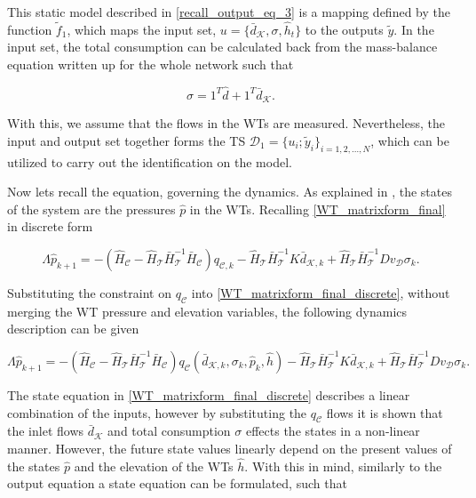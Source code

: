 This static model described in \eqref{recall_output_eq_3} is a mapping defined by the function $\tilde{f}_1$, which maps the input set, $u = \{ \bar{d}_{\mathcal{K}}, \sigma, \hat{h}_t \}$ to the outputs $\tilde{y}$. In the input set, the total consumption can be calculated back from the mass-balance equation written up for the whole network such that

\begin{equation}
\label{massbalance_identification}
 \sigma = 1^T \hat{d} + 1^T \bar{d}_{\mathcal{K}}.
\end{equation}

With this, we assume that the flows in the WTs are measured. Nevertheless, the input and output set together forms the TS $\mathcal{D}_1 = \{u_i ; \tilde{y}_i\}_{i = 1,2, ..., N}$, which can be utilized to carry out the identification on the model. 

Now lets recall the equation, governing the dynamics. As explained in , the states of the system are the pressures $\hat{p}$ in the WTs. Recalling \eqref{WT_matrixform_final} in discrete form

\begin{equation}
\label{WT_matrixform_final_discrete}
\Lambda \hat{p}_{k+1} = - (\hat{H}_{\mathcal{C}} - \hat{H}_{\mathcal{T}} \bar{H}^{-1}_{\mathcal{T}}\bar{H}_{\mathcal{C}})  q_{\mathcal{C},k}  - \hat{H}_{\mathcal{T}} \bar{H}^{-1}_{\mathcal{T}} K \bar{d}_{\mathcal{K},k} + \hat{H}_{\mathcal{T}} \bar{H}^{-1}_{\mathcal{T}} D v_{\mathcal{D}} \sigma_k.
\end{equation}

Substituting the constraint on $q_{\mathcal{C}}$ into \eqref{WT_matrixform_final_discrete}, without merging the WT pressure and elevation variables, the following dynamics description can be given

\begin{equation}
\label{WT_matrixform_final_discrete1}
\Lambda \hat{p}_{k+1} = - (\hat{H}_{\mathcal{C}} - \hat{H}_{\mathcal{T}} \bar{H}^{-1}_{\mathcal{T}}\bar{H}_{\mathcal{C}})  q_\mathcal{C}(\bar{d}_{\mathcal{K},k}, \sigma_k, \hat{p}_k, \hat{h})  - \hat{H}_{\mathcal{T}} \bar{H}^{-1}_{\mathcal{T}} K \bar{d}_{\mathcal{K},k} + \hat{H}_{\mathcal{T}} \bar{H}^{-1}_{\mathcal{T}} D v_{\mathcal{D}} \sigma_k.
\end{equation}

The state equation in \eqref{WT_matrixform_final_discrete} describes a linear combination of the inputs, however by substituting the $q_\mathcal{C}$ flows it is shown that the inlet flows $\bar{d}_{\mathcal{K}}$ and total consumption $\sigma$ effects the states in a non-linear manner. However, the future state values linearly depend on the present values of the states $\hat{p}$ and the elevation of the WTs $\hat{h}$. With this in mind, similarly to the output equation a state equation can be formulated, such that 


